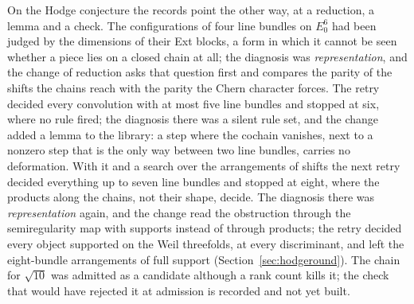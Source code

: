 On the Hodge conjecture the records point the other way, at a reduction, a lemma and a check. The configurations of four line bundles on $E_{0}^{6}$ had been judged by the dimensions of their Ext blocks, a form in which it cannot be seen whether a piece lies on a closed chain at all; the diagnosis was \emph{representation}, and the change of reduction asks that question first and compares the parity of the shifts the chains reach with the parity the Chern character forces. The retry decided every convolution with at most five line bundles and stopped at six, where no rule fired; the diagnosis there was a silent rule set, and the change added a lemma to the library: a step where the cochain vanishes, next to a nonzero step that is the only way between two line bundles, carries no deformation. With it and a search over the arrangements of shifts the next retry decided everything up to seven line bundles and stopped at eight, where the products along the chains, not their shape, decide. The diagnosis there was \emph{representation} again, and the change read the obstruction through the semiregularity map with supports instead of through products; the retry decided every object supported on the Weil threefolds, at every discriminant, and left the eight-bundle arrangements of full support (Section~\ref{sec:hodgeround}). The chain for $\sqrt{10}$ was admitted as a candidate although a rank count kills it; the check that would have rejected it at admission is recorded and not yet built.


